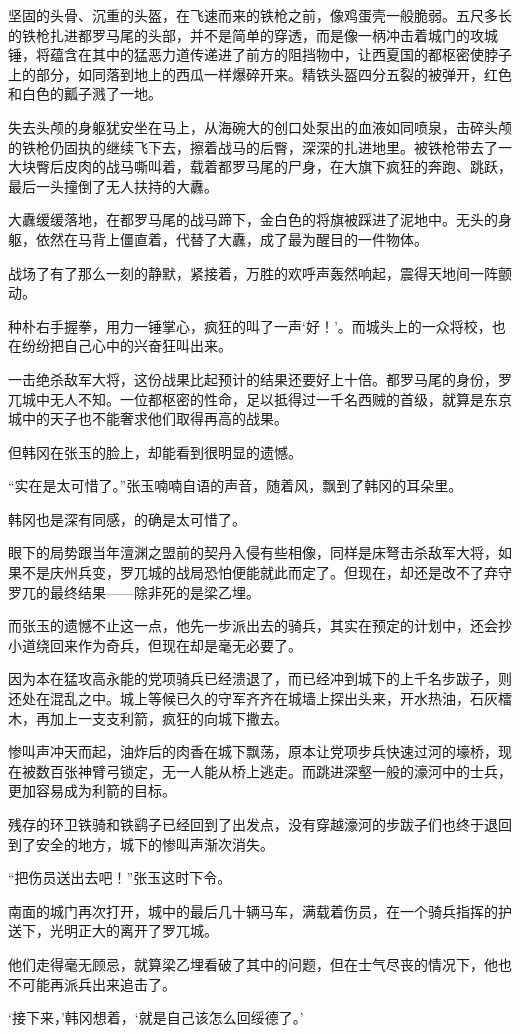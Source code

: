 坚固的头骨、沉重的头盔，在飞速而来的铁枪之前，像鸡蛋壳一般脆弱。五尺多长的铁枪扎进都罗马尾的头部，并不是简单的穿透，而是像一柄冲击着城门的攻城锤，将蕴含在其中的猛恶力道传递进了前方的阻挡物中，让西夏国的都枢密使脖子上的部分，如同落到地上的西瓜一样爆碎开来。精铁头盔四分五裂的被弹开，红色和白色的瓤子溅了一地。

失去头颅的身躯犹安坐在马上，从海碗大的创口处泵出的血液如同喷泉，击碎头颅的铁枪仍固执的继续飞下去，擦着战马的后臀，深深的扎进地里。被铁枪带去了一大块臀后皮肉的战马嘶叫着，载着都罗马尾的尸身，在大旗下疯狂的奔跑、跳跃，最后一头撞倒了无人扶持的大纛。

大纛缓缓落地，在都罗马尾的战马蹄下，金白色的将旗被踩进了泥地中。无头的身躯，依然在马背上僵直着，代替了大纛，成了最为醒目的一件物体。

战场了有了那么一刻的静默，紧接着，万胜的欢呼声轰然响起，震得天地间一阵颤动。

种朴右手握拳，用力一锤掌心，疯狂的叫了一声‘好！’。而城头上的一众将校，也在纷纷把自己心中的兴奋狂叫出来。

一击绝杀敌军大将，这份战果比起预计的结果还要好上十倍。都罗马尾的身份，罗兀城中无人不知。一位都枢密的性命，足以抵得过一千名西贼的首级，就算是东京城中的天子也不能奢求他们取得再高的战果。

但韩冈在张玉的脸上，却能看到很明显的遗憾。

“实在是太可惜了。”张玉喃喃自语的声音，随着风，飘到了韩冈的耳朵里。

韩冈也是深有同感，的确是太可惜了。

眼下的局势跟当年澶渊之盟前的契丹入侵有些相像，同样是床弩击杀敌军大将，如果不是庆州兵变，罗兀城的战局恐怕便能就此而定了。但现在，却还是改不了弃守罗兀的最终结果——除非死的是梁乙埋。

而张玉的遗憾不止这一点，他先一步派出去的骑兵，其实在预定的计划中，还会抄小道绕回来作为奇兵，但现在却是毫无必要了。

因为本在猛攻高永能的党项骑兵已经溃退了，而已经冲到城下的上千名步跋子，则还处在混乱之中。城上等候已久的守军齐齐在城墙上探出头来，开水热油，石灰檑木，再加上一支支利箭，疯狂的向城下撒去。

惨叫声冲天而起，油炸后的肉香在城下飘荡，原本让党项步兵快速过河的壕桥，现在被数百张神臂弓锁定，无一人能从桥上逃走。而跳进深壑一般的濠河中的士兵，更加容易成为利箭的目标。

残存的环卫铁骑和铁鹞子已经回到了出发点，没有穿越濠河的步跋子们也终于退回到了安全的地方，城下的惨叫声渐次消失。

“把伤员送出去吧！”张玉这时下令。

南面的城门再次打开，城中的最后几十辆马车，满载着伤员，在一个骑兵指挥的护送下，光明正大的离开了罗兀城。

他们走得毫无顾忌，就算梁乙埋看破了其中的问题，但在士气尽丧的情况下，他也不可能再派兵出来追击了。

‘接下来，’韩冈想着，‘就是自己该怎么回绥德了。’

